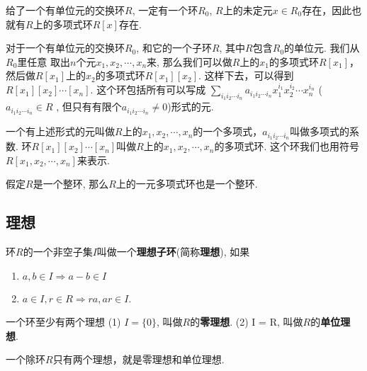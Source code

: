\begin{Theorem}
给了一个有单位元的交换环$R$, 一定有一个环$R_0$, $R$上的未定元$x \in R_0$存在，因此也就有$R$上的多项式环$R[x]$存在.
\end{Theorem}

\begin{Note}
对于一个有单位元的交换环$R_0$, 和它的一个子环$R$, 其中$R$包含$R_0$的单位元. 我们从$R_0$里任意
取出$n$个元$x_1, x_2, \cdots, x_n$来, 那么我们可以做$R$上的$x_1$的多项式环$R[x_1]$，然后做$R[x_1]$上的$x_2$的多项式环$R[x_1][x_2]$. 这样下去，可以得到$R[x_1][x_2]\cdots[x_n]$. 这个环包括所有可以写成 
$\displaystyle \sum_{i_1 i_2 \cdots i_n} a_{i_1 i_2 \cdots i_n} x_1^{i_1} x_2^{i_2} \cdots x_n^{i_n}$ ($a_{i_1 i_2 \cdots i_n} \in R$
, 但只有有限个$a_{i_1 i_2 \cdots i_n} \neq 0$)形式的元.
\end{Note}

\begin{Definition}
一个有上述形式的元叫做$R$上的$x_1, x_2, \cdots, x_n$的一个多项式，$a_{i_1 i_2 \cdots i_n}$叫做多项式的系数. 环$R[x_1][x_2]\cdots[x_n]$叫做$R$上的$x_1, x_2, \cdots, x_n$的多项式环. 这个环我们也用符号$R[x_1, x_2, \cdots, x_n]$来表示.
\end{Definition}

\begin{Proposition}
假定$R$是一个整环, 那么$R$上的一元多项式环也是一个整环.
\end{Proposition}

\subsection{理想} %

\begin{Definition}[!理想]
环$R$的一个非空子集$I$叫做一个\textbf{理想子环}(简称\textbf{理想}), 如果
\begin{enumerate}
	\item $a, b \in I \Rightarrow a - b \in I$
	\item $a \in I, r \in R \Rightarrow ra, ar \in I$.
\end{enumerate}
\end{Definition}

\begin{Proposition}
一个环至少有两个理想 (1) $I = \{\mathfrak{0}\}$, 叫做$R$的\textbf{零理想}.
(2) I = R, 叫做$R$的\textbf{单位理想}.
\end{Proposition}

\begin{Theorem}
一个除环$R$只有两个理想，就是零理想和单位理想.
\end{Theorem}


